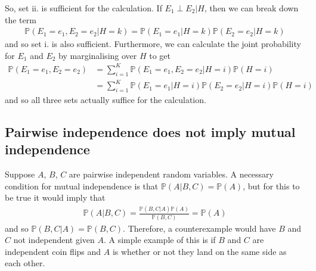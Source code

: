 \documentclass{article}
\begin{document}
So, set ii. is sufficient for the calculation. If $E_1 \perp E_2|H$, then we can break down the term
\begin{gather*}
\mathbb{P}(E_1=e_1,E_2=e_2|H=k) = \mathbb{P}(E_1=e_1|H=k)\mathbb{P}(E_2=e_2|H=k)
\end{gather*}
and so set i. is also sufficient. Furthermore, we can calculate the joint probability for $E_1$ and $E_2$ by marginalising over $H$ to get
\begin{align*}
\mathbb{P}(E_1=e_1,E_2=e_2) &= \sum_{i=1}^{K} \mathbb{P}(E_1=e_1,E_2=e_2|H=i)\mathbb{P}(H=i)\\
&= \sum_{i=1}^{K} \mathbb{P}(E_1=e_1|H=i)\mathbb{P}(E_2=e_2|H=i)\mathbb{P}(H=i)
\end{align*}
and so all three sets actually suffice for the calculation.

\subsection{Pairwise independence does not imply mutual independence}
Suppose $A$, $B$, $C$ are pairwise independent random variables. A necessary condition for mutual independence is that $\mathbb{P}(A|B,C) = \mathbb{P}(A)$, but for this to be true it would imply that
\begin{gather*}
\mathbb{P}(A|B,C) = \frac{\mathbb{P}(B,C|A)\mathbb{P}(A)}{\mathbb{P}(B,C)} = \mathbb{P}(A)
\end{gather*}
and so $\mathbb{P}(B,C|A) = \mathbb{P}(B,C)$. Therefore, a counterexample would have $B$ and $C$ not independent given $A$. A simple example of this is if $B$ and $C$ are independent coin flips and $A$ is whether or not they land on the same side as each other.
\end{document}
